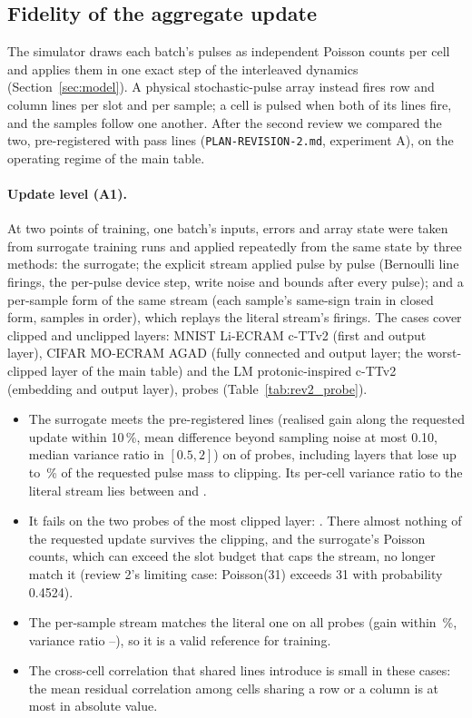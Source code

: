 \subsection{Fidelity of the aggregate update}\label{sec:fidelity}
The simulator draws each batch's pulses as independent Poisson counts per cell and applies them in one exact step of the
interleaved dynamics (Section~\ref{sec:model}). A physical stochastic-pulse array instead fires row and column lines per slot
and per sample; a cell is pulsed when both of its lines fire, and the samples follow one another. After the second review we
compared the two, pre-registered with pass lines (\texttt{PLAN-REVISION-2.md}, experiment A), on the operating regime of the
main table.

\paragraph{Update level (A1).} At two points of training, one batch's inputs, errors and array state were taken from surrogate
training runs and applied repeatedly from the same state by three methods: the surrogate; the explicit stream applied pulse by
pulse (Bernoulli line firings, the per-pulse device step, write noise and bounds after every pulse); and a per-sample form of the
same stream (each sample's same-sign train in closed form, samples in order), which replays the literal stream's firings. The
cases cover clipped and unclipped layers: MNIST Li-ECRAM c-TTv2 (first and output layer), CIFAR MO-ECRAM AGAD (fully connected and
output layer; the worst-clipped layer of the main table) and the LM protonic-inspired c-TTv2 (embedding and output layer),
\RXProbeN{} probes (Table~\ref{tab:rev2_probe}).
\begin{itemize}
\item The surrogate meets the pre-registered lines (realised gain along the requested update within 10\,\%, mean difference
      beyond sampling noise at most 0.10, median variance ratio in $[0.5, 2]$) on \RXProbeSurPassN{} of \RXProbeN{} probes,
      including layers that lose up to \RXProbeOkLostMax\,\% of the requested pulse mass to clipping. Its per-cell variance
      ratio to the literal stream lies between \RXProbeSurVarMin{} and \RXProbeSurVarMax.
\item It fails on the two probes of the most clipped layer: \RXProbeSurFailList. There almost nothing of the requested update
      survives the clipping, and the surrogate's Poisson counts, which can exceed the slot budget that caps the stream, no longer
      match it (review 2's limiting case: Poisson(31) exceeds 31 with probability 0.4524).
\item The per-sample stream matches the literal one on all \RXProbeSeqPassN{} probes (gain within \RXProbeSeqGainDevMax\,\%,
      variance ratio \RXProbeSeqVarMin--\RXProbeSeqVarMax), so it is a valid reference for training.
\item The cross-cell correlation that shared lines introduce is small in these cases: the mean residual correlation among cells
      sharing a row or a column is at most \RXProbeSlotRhoMaxAll{} in absolute value.
\end{itemize}

